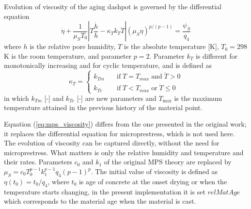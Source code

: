 \documentclass[a4paper]{article}
\begin{document}
Evolution of viscosity of the aging dashpot is governed by the differential
equation 
\begin{equation}
\label{eq:mps_viscosity}
\dot{\eta}+\frac{1}{\mu_S T_0} \left |  T \frac{\dot{h}}{h} - \kappa_T k_T \dot{T}  \right | \left( \mu_S \eta \right)^{p/\left(p-1\right)} = \frac{\psi_S}{q_4}
\end{equation}
where $h$ is the relative pore humidity, $T$ is the absolute temperature [K], $T_0 = 298$ K is the room temperature, and parameter $p = 2$. Parameter $k_T$ is different for monotonically increasing and for cyclic temperature, and is defined as
\begin{equation}
\kappa_T = \left \{ \begin{array}{ll}
k_{Tm} & \quad \mathrm{if} \; T = T_{max} \; \mathrm{and} \; \dot{T} > 0 \\
k_{Tc} & \quad \mathrm{if} \; T < T_{max} \; \mathrm{or} \; \dot{T} \leq 0 
\end{array} \right.
\label{eq:mps_temperature}
\end{equation}
in which  $k_{Tm}$ [-] and $k_{Tc}$ [-] are new parameters and $T_{\max}$ is the
maximum temperature attained in the previous history of the material point. 

Equation (\ref{eq:mps_viscosity}) differs from the one presented in the original work; it replaces the differential equation for microprestress, which is not used here. The evolution of viscosity can be captured directly, without the need for microprestress. What matters is only the relative humidity and temperature and their rates. Parameters $c_0$ and $k_1$ of the original MPS theory
are replaced by $\mu_S = c_0 T_0^{p-1} k_1^{p-1} q_4 (p-1)^p$. 
The initial value of viscosity is defined as $\eta(t_0) = t_0/q_4$,
where $t_0$ is age of concrete at the onset drying or when the
temperature starts changing, in the present implementation it is set
$relMatAge$ which corresponds to the material age when the material is cast.
\end{document}
